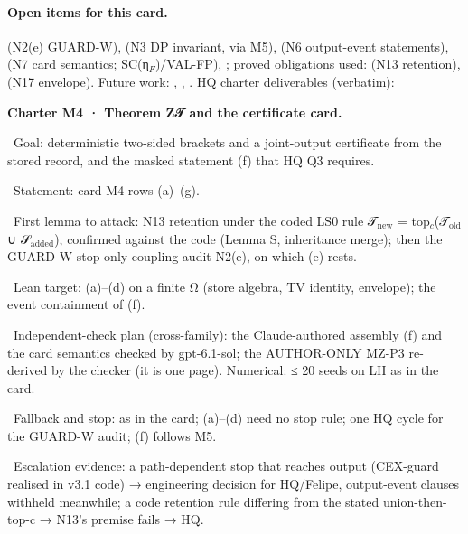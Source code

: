 \paragraph{Open items for this card.}  (N2(e) GUARD-W),  (N3 DP invariant, via M5),  (N6 output-event statements),  (N7 card semantics; SC(η$_{F}$)/VAL-FP), ; proved obligations used:  (N13 retention),  (N17 envelope). Future work: , , . HQ charter deliverables (verbatim):
\par\noindent \textbf{Charter M4 · Theorem Z𝒯 and the certificate card.}
\par\noindent \textbullet~Goal: deterministic two-sided brackets and a joint-output certificate from the stored record, and the masked statement (f) that HQ Q3 requires.
\par\noindent \textbullet~Statement: card M4 rows (a)–(g).
\par\noindent \textbullet~First lemma to attack: N13 retention under the coded LS0 rule 𝒯$_{\mathrm{new}}$ = top$_{c}$(𝒯$_{\mathrm{old}}$ ∪ 𝒮$_{\mathrm{added}}$), confirmed against the code (Lemma S, inheritance merge); then the GUARD-W stop-only coupling audit N2(e), on which (e) rests.
\par\noindent \textbullet~Lean target: (a)–(d) on a finite Ω (store algebra, TV identity, envelope); the event containment of (f).
\par\noindent \textbullet~Independent-check plan (cross-family): the Claude-authored assembly (f) and the card semantics checked by gpt-6.1-sol; the AUTHOR-ONLY MZ-P3 re-derived by the checker (it is one page). Numerical: ≤ 20 seeds on LH as in the card.
\par\noindent \textbullet~Fallback and stop: as in the card; (a)–(d) need no stop rule; one HQ cycle for the GUARD-W audit; (f) follows M5.
\par\noindent \textbullet~Escalation evidence: a path-dependent stop that reaches output (CEX-guard realised in v3.1 code) → engineering decision for HQ/Felipe, output-event clauses withheld meanwhile; a code retention rule differing from the stated union-then-top-c → N13's premise fails → HQ.

